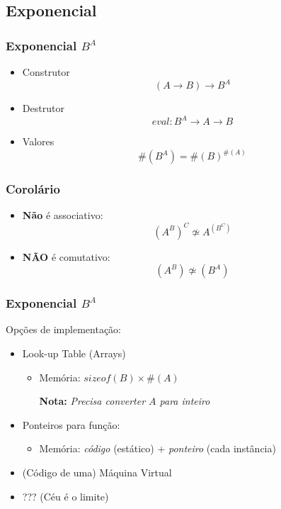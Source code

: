 \documentclass{beamer}
\newcommand{\nota}[1]{\textbf{Nota:}\textit{ #1}}
\newcommand{\typetam}{\#}
\newcommand{\typesim}{\simeq}
\begin{document}
\subsection{Exponencial}
\begin{frame}
    \frametitle{Exponencial \(B^A\)}
    \begin{itemize}
        \item Construtor
            \[
                (A \to B) \to B^A
            \]
            \vfill
        \item Destrutor
            \[
                eval : B^A \to A \to B
            \]
            \vfill
        \item Valores
            \[
                \typetam\left(B^A\right) = \typetam(B)^{\typetam(A)}
            \]
    \end{itemize}
\end{frame}

\begin{frame}
    \frametitle{Corolário}
    \begin{itemize}
        \item \textbf{Não} é associativo:
            \[
                \left(A^B\right)^C \not\typesim A^{\left(B^C\right)}
            \]
            \vfill
        \item \textbf{NÃO} é comutativo:
            \[
                \left(A^B\right) \not\typesim \left(B^A\right)
            \]
    \end{itemize}
\end{frame}

\begin{frame}
    \frametitle{Exponencial \(B^A\)}
    Opções de implementação:
    \begin{itemize}
        \item Look-up Table (Arrays)
            \begin{itemize}
                \item Memória:
                    \(sizeof(B) \times \typetam(A)\)
                    \par
                    \nota{Precisa converter \(A\) para inteiro}
            \end{itemize}
        \vfill
        \pause
        \item Ponteiros para função:
            \begin{itemize}
                \item Memória:
                    \emph{código} (estático)
                    + \emph{ponteiro} (cada instância)
            \end{itemize}
        \vfill
        \pause
        \item (Código de uma) Máquina Virtual
        \vfill
        \pause
        \item ??? (Céu é o limite)
    \end{itemize}
\end{frame}
\end{document}
